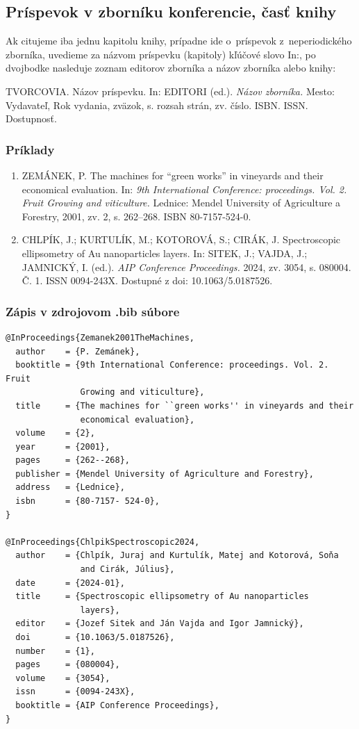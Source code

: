 \subsection{Príspevok v zborníku konferencie, časť knihy}
Ak citujeme iba jednu kapitolu knihy,
prípadne ide o~príspevok z~neperiodického zborníka,
uvedieme za názvom príspevku (kapitoly)
kľúčové slovo In:, po dvojbodke nasleduje zoznam editorov zborníka a názov zborníka alebo knihy:
\begin{trivlist}
  \item TVORCOVIA. Názov príspevku. In: EDITORI (ed.). \textit{Názov zborníka.} Mesto: Vydavateľ, Rok vydania, zväzok, s. rozsah strán, zv. číslo. ISBN. ISSN. Dostupnosť.
\end{trivlist}

\subsubsection*{\normalsize Príklady}
\begin{enumerate}
  \item ZEMÁNEK, P. The machines for ``green works'' in vineyards and their economical evaluation. In: \textit{9th International Conference: proceedings. Vol. 2. Fruit Growing and viticulture.} Lednice: Mendel University of Agriculture a Forestry, 2001, zv. 2, s. 262–268. ISBN 80-7157-524-0.

  \item CHLPÍK, J.; KURTULÍK, M.; KOTOROVÁ, S.; CIRÁK, J. Spectroscopic ellipsometry of Au nanoparticles layers. In: SITEK, J.; VAJDA, J.; JAMNICKÝ, I. (ed.). \textit{AIP Conference Proceedings.} 2024, zv. 3054, s. 080004. Č. 1. ISSN 0094-243X. Dostupné z doi: 10.1063/5.0187526.
\end{enumerate}

\subsubsection*{\normalsize Zápis v zdrojovom .bib súbore}
\begin{verbatim}
@InProceedings{Zemanek2001TheMachines,
  author    = {P. Zemánek},
  booktitle = {9th International Conference: proceedings. Vol. 2. Fruit
               Growing and viticulture},
  title     = {The machines for ``green works'' in vineyards and their
               economical evaluation},
  volume    = {2},
  year      = {2001},
  pages     = {262--268},
  publisher = {Mendel University of Agriculture and Forestry},
  address   = {Lednice},
  isbn      = {80-7157- 524-0},
}

@InProceedings{ChlpikSpectroscopic2024,
  author    = {Chlpík, Juraj and Kurtulík, Matej and Kotorová, Soňa
               and Cirák, Július},
  date      = {2024-01},
  title     = {Spectroscopic ellipsometry of Au nanoparticles
               layers},
  editor    = {Jozef Sitek and Ján Vajda and Igor Jamnický},
  doi       = {10.1063/5.0187526},
  number    = {1},
  pages     = {080004},
  volume    = {3054},
  issn      = {0094-243X},
  booktitle = {AIP Conference Proceedings},
}
\end{verbatim}

